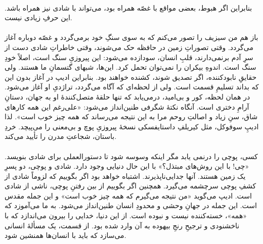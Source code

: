 \documentclass[12pt]{book}
\begin{document}
    \paragraph{}
    بنابراین اگر هبوط، بعضی مواقع با غصّه همراه بود، می‌تواند با شادی نیز همراه باشد. این حرفِ زیادی نیست.
    
    \paragraph{}
    باز هم من سیزیف را تصور می‌کنم که به سوی سنگِ خود برمی‌گردد و غصّه دوباره آغاز می‌گردد. وقتی تصوراتِ زمین در حافظه حک می‌شوند، وقتی خاطراتِ شادی دست از سرِ آدم برنمی‌دارند، قلبِ انسان، سودازده می‌شود: این پیروزیِ سنگ است، اصلاً خودِ سنگ است. اندوهِ بیکران را نمی‌توان تحمل کرد. این‌ها، شبهای گتسمانِ ما هستند. ولی حقایقِ نابودکننده، اگر تصدیق شوند، کشنده خواهند بود. بنابراین ادیپ در آغاز بدون این که بداند تسلیمِ قسمت است. ولی از لحظه‌ای که آگاه می‌گردد، تراژدیِ او آغاز می‌شود. در همان لحظه، کور و بی‌امید، درمی‌یابد که تنها حلقهٔ متصل‌کنندهٔ او به جهان، دستانِ آرامِ دختری است. آنگاه نکتهٔ شگرفی طنین‌انداز می‌شود: «علی‌رغم این همه کارهای شاق، سنِ زیاد و اصالتِ روحم مرا به این نتیجه می‌رساند که همه چیز خوب است». لذا ادیپِ سوفوکل، مثل کیریلفِ داستایفسکی نسخهٔ پیروزیِ پوچ و بی‌معنی را می‌پیچد. خردِ باستان، شجاعتِ مدرن را تأیید می‌کند.
    
    \paragraph{}
    کسی، پوچی را درنمی یابد مگر اینکه وسوسه شود تا دستورالعملی برای شادی بنویسد. «چی! با این روش‌های مبتذل؟» با این حال دنیایی وجود دارد. شادی و پوچی، دو پسرِ یک زمین هستند. آنها جدایی‌ناپذیرند. اشتباه خواهد بود اگر بگوییم که لزوماً شادی از کشفِ پوچی سرچشمه می‌گیرد. همچنین اگر بگوییم از بین رفتنِ پوچی، ناشی از شادی است. ادیپ می‌گوید «من نتیجه می‌گیرم که همه چیز خوب است» و این جمله مقدس است. این جمله در جهانِ وحشی و محدودِ انسان طنین‌انداز می‌شود. به ما می‌آموزد که «همه»، خسته‌کننده نیست و نبوده است. از این دنیا، خدایی را بیرون می‌اندازد که با ناخشنودی و ترجیحِ رنجِ بیهوده به آن وارد شده بود. از قسمت، یک مسألهٔ انسانی می‌سازد که باید با انسان‌ها همنشین شود.
    
\end{document}
